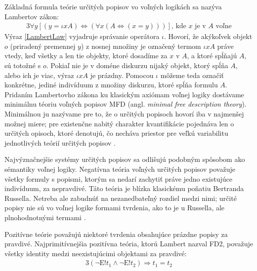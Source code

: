 \documentclass[12pt, letterpaper]{article}
\begin{document}
Základná formula teórie určitých popisov vo voľných logikách sa nazýva Lambertov zákon:
\begin{alignat}{3}
      \forall y [(y = \iota x A) \iff (\forall x (A \iff (x = y)))]\text{, kde $x$ je v $A$ voľne} \label{LambertLaw}
\end{alignat}
\noindent Výraz \ref{LambertLaw} vyjadruje správanie operátora $\iota$. Hovorí, že akýkoľvek objekt $o$ (priradený premennej $y$) z nosnej množiny je označený termom $\iota x A$ práve vtedy, keď všetky a len tie objekty, ktoré dosadíme za $x$ v $A$, a ktoré spĺňajú $A$, sú totožné s $o$. Pokiaľ nie je v doméne diskurzu nijaký objekt, ktorý spĺňa $A$, alebo ich je viac, výraz $\iota x A$ je prázdny. Pomocou $\iota$ môžeme teda označiť konkrétne, jediné indivíduum z množiny diskurzu, ktoré spĺňa formulu $A$. Pridaním Lambertovho zákona ku klasickým axiómam voľnej logiky dostávame minimálnu téoriu voľných popisov MFD (angl. \textit{minimal free description theory}). Minimálnou ju nazývame pre to, že o určitých popisoch hovorí iba v najmenšej možnej miere; pre existenčne nabitý charakter kvantifikácie pojednáva len o určitých opisoch, ktoré denotujú, čo necháva priestor pre veľkú variabilitu jednotlivých teórií určitých popisov \parencites[190]{Bencivenga2002}[90]{LambertHierarchy}[228]{Lehmann2002}[22]{Morscher2001}[1041]{Nolt2007}[]{sep-logic-free}.\par
Najvýznačnejšie systémy určitých popisov sa odlišujú podobným spôsobom ako sémantiky voľnej logiky. Negatívna teória voľných určitých popisov považuje všetky formuly s popismi, ktorým sa nedarí zachytiť práve jedno existujúce indivíduum, za nepravdivé. Táto teória je blízka klasickému poňatiu Bertranda Russella. Netreba ale zabudnúť na nezanedbateľný rozdiel medzi nimi; určité popisy nie sú vo voľnej logike formami tvrdenia, ako to je u Russella, ale plnohodnotnými termami \parencites[245]{Lehmann2002}{Morscher2001}[1041--1042]{Nolt2007}[]{sep-logic-free}.\par
Pozitívne teórie považujú niektoré tvrdenia obsahujúce prázdne popisy za pravdivé. Najprimitívnejšia pozitívna teória, ktorú Lambert nazval FD2, považuje všetky identity medzi neexistujúcimi objektami za pravdivé:
 \begin{alignat}{3}
	  (\neg\text{E}!t_{1} \land \neg\text{E}!t_{2}) \Rightarrow t_{1} = t_{2} \label{ChObj}
\end{alignat}
\end{document}
